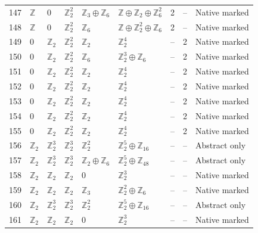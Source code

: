 \documentclass[10pt]{article}
\begin{document}
\begin{longtable}{r|lllll|rrl}
147 & $\mathbb{Z}$ & $0$ & $\mathbb{Z}_{2}^{2}$ & $\mathbb{Z}_{3}\oplus \mathbb{Z}_{6}$ & $\mathbb{Z}\oplus \mathbb{Z}_{2}\oplus \mathbb{Z}_{6}^{2}$ & 2 & -- & Native marked\\
148 & $\mathbb{Z}$ & $0$ & $\mathbb{Z}_{2}^{2}$ & $\mathbb{Z}_{6}$ & $\mathbb{Z}\oplus \mathbb{Z}_{2}^{2}\oplus \mathbb{Z}_{6}$ & 2 & -- & Native marked\\
149 & $0$ & $\mathbb{Z}_{2}$ & $\mathbb{Z}_{2}^{2}$ & $\mathbb{Z}_{2}$ & $\mathbb{Z}_{2}^{4}$ & -- & 2 & Native marked\\
150 & $0$ & $\mathbb{Z}_{2}$ & $\mathbb{Z}_{2}^{2}$ & $\mathbb{Z}_{6}$ & $\mathbb{Z}_{2}^{3}\oplus \mathbb{Z}_{6}$ & -- & 2 & Native marked\\
151 & $0$ & $\mathbb{Z}_{2}$ & $\mathbb{Z}_{2}^{2}$ & $\mathbb{Z}_{2}$ & $\mathbb{Z}_{2}^{4}$ & -- & 2 & Native marked\\
152 & $0$ & $\mathbb{Z}_{2}$ & $\mathbb{Z}_{2}^{2}$ & $\mathbb{Z}_{2}$ & $\mathbb{Z}_{2}^{4}$ & -- & 2 & Native marked\\
153 & $0$ & $\mathbb{Z}_{2}$ & $\mathbb{Z}_{2}^{2}$ & $\mathbb{Z}_{2}$ & $\mathbb{Z}_{2}^{4}$ & -- & 2 & Native marked\\
154 & $0$ & $\mathbb{Z}_{2}$ & $\mathbb{Z}_{2}^{2}$ & $\mathbb{Z}_{2}$ & $\mathbb{Z}_{2}^{4}$ & -- & 2 & Native marked\\
155 & $0$ & $\mathbb{Z}_{2}$ & $\mathbb{Z}_{2}^{2}$ & $\mathbb{Z}_{2}$ & $\mathbb{Z}_{2}^{4}$ & -- & 2 & Native marked\\
156 & $\mathbb{Z}_{2}$ & $\mathbb{Z}_{2}^{3}$ & $\mathbb{Z}_{2}^{3}$ & $\mathbb{Z}_{2}^{2}$ & $\mathbb{Z}_{2}^{5}\oplus \mathbb{Z}_{16}$ & -- & -- & Abstract only\\
157 & $\mathbb{Z}_{2}$ & $\mathbb{Z}_{2}^{3}$ & $\mathbb{Z}_{2}^{3}$ & $\mathbb{Z}_{2}\oplus \mathbb{Z}_{6}$ & $\mathbb{Z}_{2}^{5}\oplus \mathbb{Z}_{48}$ & -- & -- & Abstract only\\
158 & $\mathbb{Z}_{2}$ & $\mathbb{Z}_{2}$ & $\mathbb{Z}_{2}$ & $0$ & $\mathbb{Z}_{2}^{3}$ & -- & -- & Native marked\\
159 & $\mathbb{Z}_{2}$ & $\mathbb{Z}_{2}$ & $\mathbb{Z}_{2}$ & $\mathbb{Z}_{3}$ & $\mathbb{Z}_{2}^{2}\oplus \mathbb{Z}_{6}$ & -- & -- & Native marked\\
160 & $\mathbb{Z}_{2}$ & $\mathbb{Z}_{2}^{3}$ & $\mathbb{Z}_{2}^{3}$ & $\mathbb{Z}_{2}^{2}$ & $\mathbb{Z}_{2}^{5}\oplus \mathbb{Z}_{16}$ & -- & -- & Abstract only\\
161 & $\mathbb{Z}_{2}$ & $\mathbb{Z}_{2}$ & $\mathbb{Z}_{2}$ & $0$ & $\mathbb{Z}_{2}^{3}$ & -- & -- & Native marked\\

\end{longtable}
\end{document}
